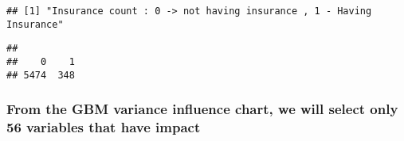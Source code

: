 \documentclass[]{article}
\newenvironment{Shaded}{\begin{snugshade}}{\end{snugshade}}
\newcommand{\KeywordTok}[1]{\textcolor[rgb]{0.13,0.29,0.53}{\textbf{#1}}}
\newcommand{\OperatorTok}[1]{\textcolor[rgb]{0.81,0.36,0.00}{\textbf{#1}}}
\newcommand{\NormalTok}[1]{#1}
\begin{document}
\begin{verbatim}
## [1] "Insurance count : 0 -> not having insurance , 1 - Having Insurance"
\end{verbatim}

\begin{Shaded}
\end{Shaded}

\begin{verbatim}
## 
##    0    1 
## 5474  348
\end{verbatim}

\subsubsection{From the GBM variance influence chart, we will select
only 56 variables that have
impact}\label{from-the-gbm-variance-influence-chart-we-will-select-only-56-variables-that-have-impact}
\end{document}
